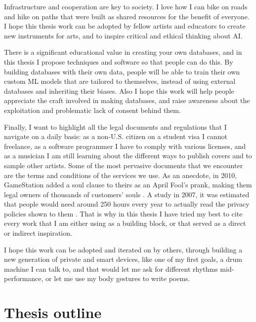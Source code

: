 Infrastructure and cooperation are key to society. I love how I can bike on roads and hike on paths that were built as shared resources for the benefit of everyone. I hope this thesis work can be adopted by fellow artists and educators to create new instruments for arts, and to inspire critical and ethical thinking about \acrshort{AI}.

There is a significant educational value in creating your own databases, and in this thesis I propose techniques and software so that people can do this. By building databases with their own data, people will be able to train their own custom \acrshort{ML} models that are tailored to themselves, instead of using external databases and inheriting their biases. Also I hope this work will help people appreciate the craft involved in making databases, and raise awareness about the exploitation and problematic lack of consent behind them.

Finally, I want to highlight all the legal documents and regulations that I navigate on a daily basis: as a non-U.S. citizen on a student visa I cannot freelance, as a software programmer I have to comply with various licenses, and as a musician I am still learning about the different ways to publish covers and to sample other artists. Some of the most pervasive documents that we encounter are the terms and conditions of the services we use. As an anecdote, in 2010, GameStation added a soul clause to theirs as an April Fool's prank, making them legal owners of thousands of customers' souls \cite{website-huffpost-gamestation-soul-clause}. A study in 2007, it was estimated that people would need around 250 hours every year to actually read the privacy policies shown to them \cite{article-cost-of-reading-privacy-policies}. That is why in this thesis I have tried my best to cite every work that I am either using as a building block, or that served as a direct or indirect inspiration.

I hope this work can be adopted and iterated on by others, through building a new generation of private and smart devices, like one of my first goals, a drum machine I can talk to, and that would let me ask for different rhythms mid-performance, or let me use my body gestures to write poems.

\section{Thesis outline}

